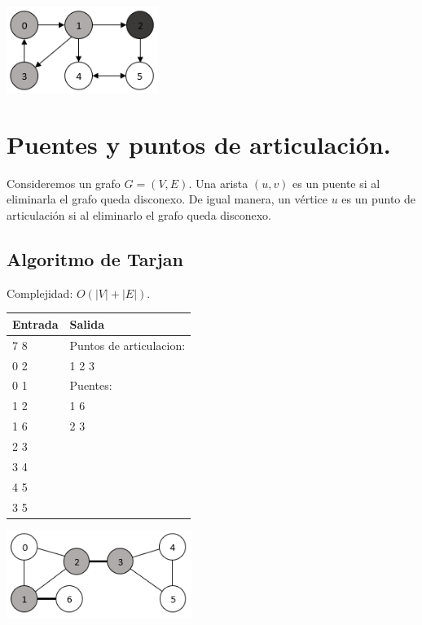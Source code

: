 \documentclass[12pt, letterpaper, twoside]{article}
\begin{document}
\begin{center}
\includegraphics[width = 0.37\textwidth]{StronglyConnected.png}
\end{center}

\newpage

\section{Puentes y puntos de articulación.}

Consideremos un grafo $G = (V, E)$. Una arista $(u, v)$ es un puente si al eliminarla el grafo queda disconexo. De igual manera, un vértice $u$ es un punto de articulación si al eliminarlo el grafo queda disconexo.

\subsection{Algoritmo de Tarjan}

Complejidad: $O(|V| + |E|)$.

 \medskip

\begin{tabular}{|p{7cm}|p{7cm}|}
\hline
\textbf{Entrada} & \textbf{Salida}\\ \hline
7 8 & Puntos de articulacion:\\
0 2 & 1 2 3\\
0 1 & Puentes:\\
1 2 & 1 6\\ 
1 6 & 2 3\\
2 3 & \\
3 4 & \\
4 5 & \\
3 5 & \\ \hline
\end{tabular}

\begin{center}
\includegraphics[width = 0.45\textwidth]{Bridge-Articulation.png}
\end{center}
\end{document}

